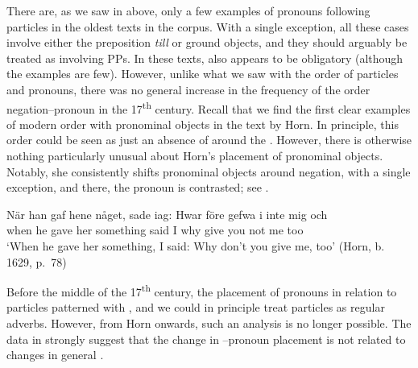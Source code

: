 \documentclass[output=paper]{langscibook}
\begin{document}
There are, as we saw in  above, only a few examples of pronouns following particles in the oldest texts in the corpus. With a single exception, all these cases involve either the preposition \textit{till} or ground objects, and they should arguably be treated as involving PPs. In these texts,  also appears to be obligatory (although the examples are few). However, unlike what we saw with the order of particles and pronouns, there was no general increase in the frequency of the order negation–pronoun in the 17\textsuperscript{th} century. Recall that we find the first clear examples of modern  order with pronominal objects in the text by Horn. In principle, this order could be seen as just an absence of  around the . However, there is otherwise nothing particularly unusual about Horn’s placement of pronominal objects. Notably, she consistently shifts pronominal objects around negation, with a single exception, and there, the pronoun is contrasted; see .\largerpage


\ea\label{ex:lalu:52}
\gll  När       han  gaf   hene   någet,       sade   iag:   {Hwar före} gefwa   i     inte   mig   och\\
when    he   gave   her   something   said   I       why   give     you   not   me   too\\
\glt `When he gave her something, I said: Why don’t you give me, too’ (Horn, b. 1629, p.~78)\\
\z


Before the middle of the 17\textsuperscript{th} century, the placement of pronouns in relation to particles patterned with , and we could in principle treat particles as regular adverbs. However, from Horn onwards, such an analysis is no longer possible. The data in  strongly suggest that the change in –pronoun placement is not related to changes in general .
\end{document}
